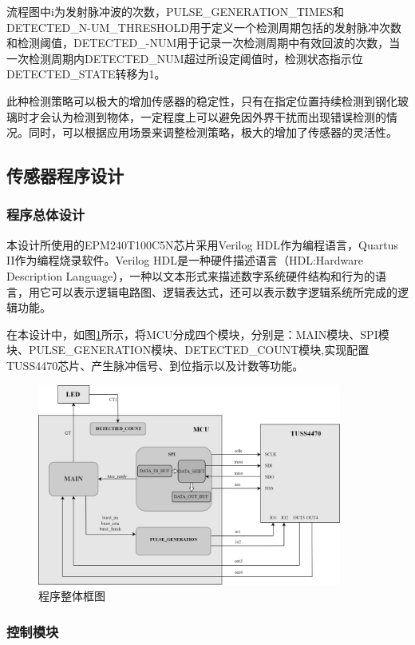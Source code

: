 流程图中i为发射脉冲波的次数，PULSE\_GENERATION\_TIMES和DETECTED\_N-UM\_THRESHOLD用于定义一个检测周期包括的发射脉冲次数和检测阈值，DETECTED\_-NUM用于记录一次检测周期中有效回波的次数，当一次检测周期内DETECTED\_NUM超过所设定阈值时，检测状态指示位DETECTED\_STATE转移为1。\par
此种检测策略可以极大的增加传感器的稳定性，只有在指定位置持续检测到钢化玻璃时才会认为检测到物体，一定程度上可以避免因外界干扰而出现错误检测的情况。同时，可以根据应用场景来调整检测策略，极大的增加了传感器的灵活性。


\subsection{传感器程序设计}
\subsubsection{程序总体设计}
本设计所使用的EPM240T100C5N芯片采用Verilog HDL作为编程语言，Quartus II作为编程烧录软件。Verilog HDL是一种硬件描述语言（HDL:Hardware Description Language），一种以文本形式来描述数字系统硬件结构和行为的语言，用它可以表示逻辑电路图、逻辑表达式，还可以表示数字逻辑系统所完成的逻辑功能。\par
在本设计中，如图\ref{程序整体框图}所示，将MCU分成四个模块，分别是：MAIN模块、SPI模块、PULSE\_GENERATION模块、DETECTED\_COUNT模块,实现配置TUSS4470芯片、产生脉冲信号、到位指示以及计数等功能。
\begin{figure}[!h]
	\centering
	\includegraphics[width=10cm]{figure/Overall program block diagram.png}
	\caption{程序整体框图}
	\label{程序整体框图}
\end{figure}
\newpage
\subsubsection{控制模块}

